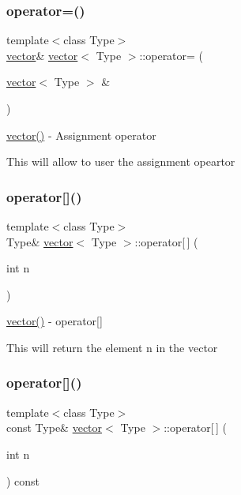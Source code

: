 \subsubsection{\texorpdfstring{operator=()}{operator=()}\hspace{0.1cm}{\footnotesize\ttfamily [2/2]}}
{\footnotesize\ttfamily template$<$class Type$>$ \\
\hyperlink{classvector}{vector}\& \hyperlink{classvector}{vector}$<$ Type $>$\+::operator= (\begin{DoxyParamCaption}\item[{\hyperlink{classvector}{vector}$<$ Type $>$ \&}]{ }\end{DoxyParamCaption})}



\hyperlink{classvector_ab8d8ebaa9b91a05bb7a94371cb84c042}{vector()} -\/ Assignment operator 

This will allow to user the assignment opeartor \hypertarget{classvector_ae7389576636ca0117a731ed2626ac747}{}\label{classvector_ae7389576636ca0117a731ed2626ac747} 
\subsubsection{\texorpdfstring{operator[]()}{operator[]()}\hspace{0.1cm}{\footnotesize\ttfamily [1/2]}}
{\footnotesize\ttfamily template$<$class Type$>$ \\
Type\& \hyperlink{classvector}{vector}$<$ Type $>$\+::operator\mbox{[}$\,$\mbox{]} (\begin{DoxyParamCaption}\item[{int}]{n }\end{DoxyParamCaption})\hspace{0.3cm}{\ttfamily [inline]}}



\hyperlink{classvector_ab8d8ebaa9b91a05bb7a94371cb84c042}{vector()} -\/ operator\mbox{[}\mbox{]} 

This will return the element n in the vector \hypertarget{classvector_ae7ec6942e0a373dc03c99796ce3555eb}{}\label{classvector_ae7ec6942e0a373dc03c99796ce3555eb} 
\subsubsection{\texorpdfstring{operator[]()}{operator[]()}\hspace{0.1cm}{\footnotesize\ttfamily [2/2]}}
{\footnotesize\ttfamily template$<$class Type$>$ \\
const Type\& \hyperlink{classvector}{vector}$<$ Type $>$\+::operator\mbox{[}$\,$\mbox{]} (\begin{DoxyParamCaption}\item[{int}]{n }\end{DoxyParamCaption}) const\hspace{0.3cm}{\ttfamily [inline]}}



